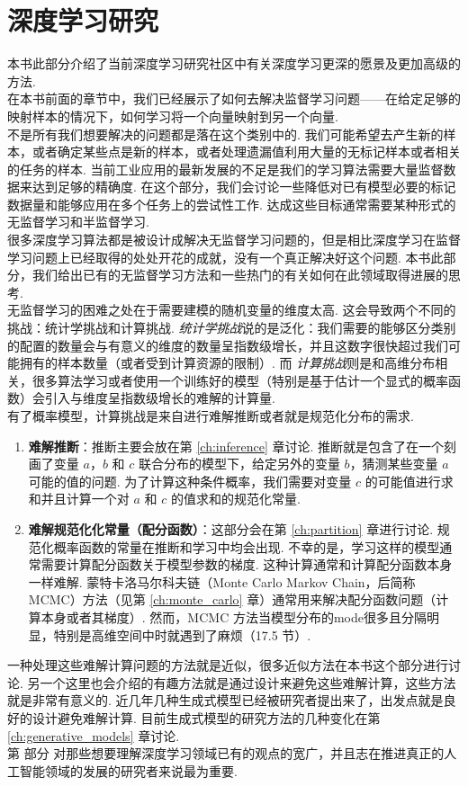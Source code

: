 \part{深度学习研究}
\label{part_research}

本书此部分介绍了当前深度学习研究社区中有关深度学习更深的愿景及更加高级的方法. \\

在本书前面的章节中，我们已经展示了如何去解决监督学习问题——在给定足够的映射样本的情况下，如何学习将一个向量映射到另一个向量. \\

不是所有我们想要解决的问题都是落在这个类别中的. 我们可能希望去产生新的样本，或者确定某些点是新的样本，或者处理遗漏值利用大量的无标记样本或者相关的任务的样本. 当前工业应用的最新发展的不足是我们的学习算法需要大量监督数据来达到足够的精确度. 在这个部分，我们会讨论一些降低对已有模型必要的标记数据量和能够应用在多个任务上的尝试性工作. 达成这些目标通常需要某种形式的无监督学习和半监督学习.\\

很多深度学习算法都是被设计成解决无监督学习问题的，但是相比深度学习在监督学习问题上已经取得的处处开花的成就，没有一个真正解决好这个问题. 本书此部分，我们给出已有的无监督学习方法和一些热门的有关如何在此领域取得进展的思考.\\

无监督学习的困难之处在于需要建模的随机变量的维度太高. 这会导致两个不同的挑战：统计学挑战和计算挑战. \emph{统计学挑战}说的是泛化：我们需要的能够区分类别的配置的数量会与有意义的维度的数量呈指数级增长，并且这数字很快超过我们可能拥有的样本数量（或者受到计算资源的限制）. 而 \emph{计算挑战}则是和高维分布相关，很多算法学习或者使用一个训练好的模型（特别是基于估计一个显式的概率函数）会引入与维度呈指数级增长的难解的计算量.\\

有了概率模型，计算挑战是来自进行难解推断或者就是规范化分布的需求.\\

\begin{enumerate}
\item \textbf{难解推断}：推断主要会放在第 \ref{ch:inference} 章讨论. 推断就是包含了在一个刻画了变量 $a$，$b$ 和 $c$ 联合分布的模型下，给定另外的变量 $b$，猜测某些变量 $a$ 可能的值的问题. 为了计算这种条件概率，我们需要对变量 $c$ 的可能值进行求和并且计算一个对 $a$ 和 $c$ 的值求和的规范化常量.
\item \textbf{难解规范化化常量（配分函数）}：这部分会在第 \ref{ch:partition} 章进行讨论. 规范化概率函数的常量在推断和学习中均会出现. 不幸的是，学习这样的模型通常需要计算配分函数关于模型参数的梯度. 这种计算通常和计算配分函数本身一样难解. 蒙特卡洛马尔科夫链（Monte Carlo Markov Chain，后简称 MCMC）方法（见第 \ref{ch:monte_carlo} 章）通常用来解决配分函数问题（计算本身或者其梯度）. 然而，MCMC 方法当模型分布的\gls*{mode}很多且分隔明显，特别是高维空间中时就遇到了麻烦（17.5 节）.
\end{enumerate}

一种处理这些难解计算问题的方法就是近似，很多近似方法在本书这个部分进行讨论. 另一个这里也会介绍的有趣方法就是通过设计来避免这些难解计算，这些方法就是非常有意义的. 近几年几种生成式模型已经被研究者提出来了，出发点就是良好的设计避免难解计算. 目前生成式模型的研究方法的几种变化在第 \ref{ch:generative_models} 章讨论. \\

第 \ref{part_research} 部分 对那些想要理解深度学习领域已有的观点的宽广，并且志在推进真正的人工智能领域的发展的研究者来说最为重要. 

